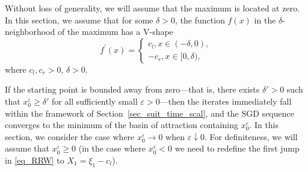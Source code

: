 \documentclass{article}
\theoremstyle{plain}
\theoremstyle{definition}
\theoremstyle{remark}
\newcommand{\ra }{ \rightarrow} %
\begin{document}
Without loss of generality, we will assume that the maximum is located at zero. In this section, we assume that for some $\delta > 0$, the function $f(x)$ in the $\delta$-neighborhood of the maximum has a V-shape
\begin{equation}\label{eq_sharp_max_3}
f^{\prime}(x)=\left\{\begin{array}{l}
c_l, x \in (-\delta, 0), \\
-c_r, x \in[0, \delta),
\end{array}\right.
\end{equation}
where $c_l, c_r > 0$, $\delta>0$.

If the starting point is bounded away from zero—that is, there exists $\delta' > 0$ such that $x_0^{\varepsilon} \geq \delta'$ for all sufficiently small $\varepsilon > 0$—then the iterates immediately fall within the framework of Section~\ref{sec_suit_time_scal}, and the SGD sequence converges to the minimum of the basin of attraction containing $x_0^{\varepsilon}$. In this section, we consider the case where $x_0^{\varepsilon} \ra 0 $ when $\varepsilon \downarrow 0.$ For definiteness, we will assume that $x_0^{\varepsilon} \geqslant 0$ (in the case where $x_0^{\varepsilon} <0$ we need to redefine the first  jump in \eqref{eq_RRW} to $X_1 = \xi_1 - c_l$). 
\end{document}
